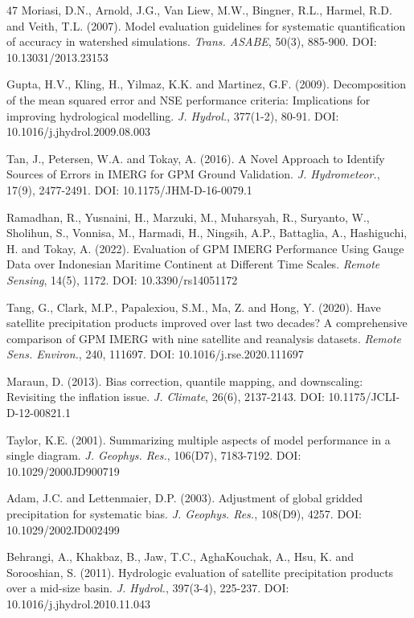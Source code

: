 \documentclass[11pt,a4paper]{article}
\begin{document}
{\begin{thebibliography}{47}
 Moriasi, D.N., Arnold, J.G., Van Liew, M.W., Bingner, R.L.,
Harmel, R.D. and Veith, T.L. (2007). Model evaluation guidelines for
systematic quantification of accuracy in watershed simulations.
\emph{Trans. ASABE}, 50(3), 885-900. DOI: 10.13031/2013.23153

 Gupta, H.V., Kling, H., Yilmaz, K.K. and Martinez, G.F. (2009).
Decomposition of the mean squared error and NSE performance criteria:
Implications for improving hydrological modelling. \emph{J. Hydrol.},
377(1-2), 80-91. DOI: 10.1016/j.jhydrol.2009.08.003

 Tan, J., Petersen, W.A. and Tokay, A. (2016). A Novel Approach
to Identify Sources of Errors in IMERG for GPM Ground Validation.
\emph{J. Hydrometeor.}, 17(9), 2477-2491. DOI: 10.1175/JHM-D-16-0079.1

 Ramadhan, R., Yusnaini, H., Marzuki, M., Muharsyah, R.,
Suryanto, W., Sholihun, S., Vonnisa, M., Harmadi, H., Ningsih, A.P.,
Battaglia, A., Hashiguchi, H. and Tokay, A. (2022). Evaluation of GPM
IMERG Performance Using Gauge Data over Indonesian Maritime Continent at
Different Time Scales. \emph{Remote Sensing}, 14(5), 1172. DOI:
10.3390/rs14051172

 Tang, G., Clark, M.P., Papalexiou, S.M., Ma, Z. and Hong, Y.
(2020). Have satellite precipitation products improved over last two
decades? A comprehensive comparison of GPM IMERG with nine satellite and
reanalysis datasets. \emph{Remote Sens. Environ.}, 240, 111697. DOI:
10.1016/j.rse.2020.111697

 Maraun, D. (2013). Bias correction, quantile mapping, and
downscaling: Revisiting the inflation issue. \emph{J. Climate}, 26(6),
2137-2143. DOI: 10.1175/JCLI-D-12-00821.1

 Taylor, K.E. (2001). Summarizing multiple aspects of model
performance in a single diagram. \emph{J. Geophys. Res.}, 106(D7),
7183-7192. DOI: 10.1029/2000JD900719

 Adam, J.C. and Lettenmaier, D.P. (2003). Adjustment of global
gridded precipitation for systematic bias. \emph{J. Geophys. Res.},
108(D9), 4257. DOI: 10.1029/2002JD002499

 Behrangi, A., Khakbaz, B., Jaw, T.C., AghaKouchak, A., Hsu, K.
and Sorooshian, S. (2011). Hydrologic evaluation of satellite
precipitation products over a mid-size basin. \emph{J. Hydrol.},
397(3-4), 225-237. DOI: 10.1016/j.jhydrol.2010.11.043


\end{thebibliography}}
\end{document}
